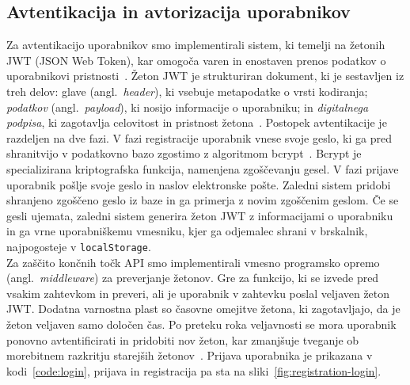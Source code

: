 \documentclass[a4paper,12pt,openright]{book}
\begin{document}
\subsection{Avtentikacija in avtorizacija uporabnikov}
\label{sec:avtentikacija}
Za avtentikacijo uporabnikov smo implementirali sistem, ki temelji na žetonih JWT (JSON Web Token), kar omogoča varen in enostaven prenos podatkov o uporabnikovi pristnosti~\cite{jwt-rfc7519}. 
Žeton JWT je strukturiran dokument, ki je sestavljen iz treh delov: glave (angl.\ \textit{header}), ki vsebuje metapodatke o vrsti kodiranja; \textit{podatkov} (angl.\ \textit{payload}), ki nosijo informacije o uporabniku; in \textit{digitalnega podpisa}, ki zagotavlja celovitost in pristnost žetona~\cite{jwt-rfc7519}.
Postopek avtentikacije je razdeljen na dve fazi. V fazi registracije uporabnik vnese svoje geslo, ki ga pred shranitvijo v podatkovno bazo zgostimo z algoritmom bcrypt~\cite{bcrypt-password}. Bcrypt je specializirana kriptografska funkcija, namenjena zgoščevanju gesel. 
 V fazi prijave uporabnik pošlje svoje geslo in naslov elektronske pošte. Zaledni sistem pridobi shranjeno zgoščeno geslo iz baze in ga primerja z novim zgoščenim geslom.
  Če se gesli ujemata, zaledni sistem generira žeton JWT z informacijami o uporabniku in ga vrne
 uporabniškemu vmesniku, kjer ga odjemalec shrani v brskalnik, najpogosteje v \texttt{localStorage}.\\
Za zaščito končnih točk API smo implementirali vmesno programsko opremo (angl.\ \emph{middleware}) za preverjanje žetonov. Gre za funkcijo, ki se izvede pred vsakim zahtevkom in preveri,
 ali je uporabnik v zahtevku poslal veljaven žeton JWT. Dodatna varnostna plast so časovne omejitve žetona, ki zagotavljajo,
 da je žeton veljaven samo določen čas. Po preteku roka veljavnosti se mora uporabnik ponovno avtentificirati in pridobiti nov žeton,
  kar zmanjšuje tveganje ob morebitnem razkritju starejših žetonov~\cite{jwt-security-best-practices}. Prijava uporabnika je prikazana v kodi~\ref{code:login},
  prijava in registracija pa sta na sliki~\ref{fig:registration-login}.
\end{document}
